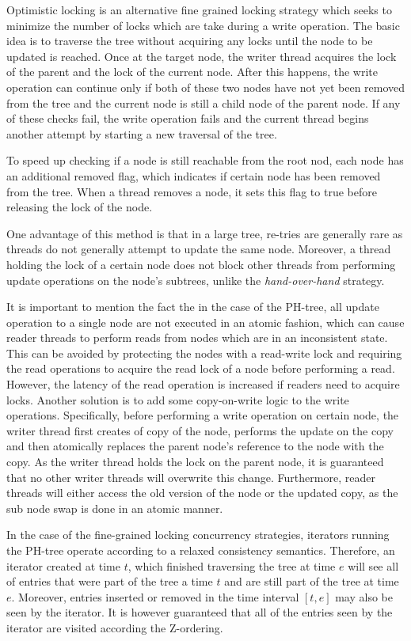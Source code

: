 \documentclass[11pt,a4paper]{globis-book}
\begin{document}
Optimistic locking is an alternative fine grained locking strategy which seeks to minimize the number of locks which are take during a write operation. The basic idea is to traverse the tree without acquiring any locks until the node to be updated is reached. Once at the target node, the writer thread acquires the lock of the parent and the lock of the current node. After this happens, the write operation can continue only if both of these two nodes have not yet been removed from the tree and the current node is still a child node of the parent node. If any of these checks fail, the write operation fails and the current thread begins another attempt by starting a new traversal of the tree.

To speed up checking if a node is still reachable from the root nod, each node has an additional removed flag, which indicates if certain node has been removed from the tree. When a thread removes a node, it sets this flag to true before releasing the lock of the node. 

One advantage of this method is that in a large tree, re-tries are generally rare as threads do not generally attempt to update the same node. Moreover, a thread holding the lock of a certain node does not block other threads from performing update operations on the node's subtrees, unlike the \textit{hand-over-hand} strategy.

It is important to mention the fact the in the case of the PH-tree, all update operation to a single node are not executed in an atomic fashion, which can cause reader threads to perform reads from nodes which are in an inconsistent state. This can be avoided by protecting the nodes with a read-write lock and requiring the read operations to acquire the read lock of a node before performing a read. However, the latency of the read operation is increased if readers need to acquire locks. Another solution is to add some copy-on-write logic to the write operations. Specifically, before performing a write operation on certain node, the writer thread first creates of copy of the node, performs the update on the copy and then atomically replaces the parent node's reference to the node with the copy. As the writer thread holds the lock on the parent node, it is guaranteed that no other writer threads will overwrite this change. Furthermore, reader threads will either access the old version of the node or the updated copy, as the sub node swap is done in an atomic manner.

In the case of the fine-grained locking concurrency strategies, iterators running the PH-tree operate according to a relaxed consistency semantics. Therefore, an iterator created at time $t$, which finished traversing the tree at time $e$ will see all of entries that were part of the tree a time $t$ and are still part of the tree at time $e$. Moreover, entries inserted or removed in the time interval $[t, e]$ may also be seen by the iterator. It is however guaranteed that all of the entries seen by the iterator are visited according the Z-ordering. 
\end{document}
